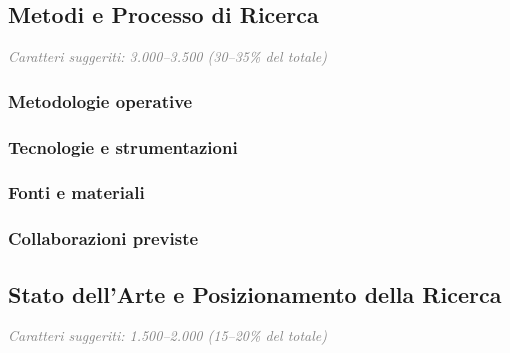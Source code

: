 \documentclass{gs-adonis}
\begin{document}
\subsection{Metodi e Processo di Ricerca}
{\small\textcolor{gray}{\textit{Caratteri suggeriti: 3.000--3.500 (30--35\% del totale)}}}


\subsubsection{Metodologie operative}

\subsubsection{Tecnologie e strumentazioni}

\subsubsection{Fonti e materiali}

\subsubsection{Collaborazioni previste}

\subsection{Stato dell'Arte e Posizionamento della Ricerca}
{\small\textcolor{gray}{\textit{Caratteri suggeriti: 1.500--2.000 (15--20\% del totale)}}}
\end{document}
